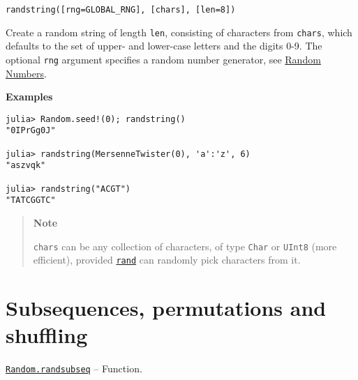 \begin{adjustwidth}{2em}{0pt}


\begin{verbatim}
randstring([rng=GLOBAL_RNG], [chars], [len=8])
\end{verbatim}

Create a random string of length \texttt{len}, consisting of characters from \texttt{chars}, which defaults to the set of upper- and lower-case letters and the digits 0-9. The optional \texttt{rng} argument specifies a random number generator, see \hyperlink{16621464973028186601}{Random Numbers}.

\textbf{Examples}


\begin{verbatim}
julia> Random.seed!(0); randstring()
"0IPrGg0J"

julia> randstring(MersenneTwister(0), 'a':'z', 6)
"aszvqk"

julia> randstring("ACGT")
"TATCGGTC"
\end{verbatim}

\begin{quote}
\textbf{Note}

\texttt{chars} can be any collection of characters, of type \texttt{Char} or \texttt{UInt8} (more efficient), provided \hyperlink{7668863842145012694}{\texttt{rand}} can randomly pick characters from it.

\end{quote}


\end{adjustwidth}

\hypertarget{1694954649783113139}{}


\section{Subsequences, permutations and shuffling}


\hypertarget{10454370655022505544}{} 
\hyperlink{10454370655022505544}{\texttt{Random.randsubseq}}  -- {Function.}


